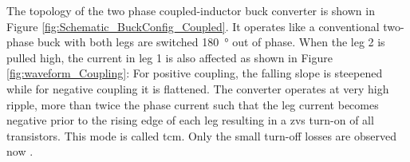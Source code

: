 \documentclass{IPEC2026}
\newcommand{\ac}{\gls}
\begin{document}
The topology of the two phase coupled-inductor buck converter is shown in Figure \ref{fig:Schematic_BuckConfig_Coupled}. It operates like a conventional two-phase buck with both legs are switched \qty{180}{\degree} out of phase. When the leg 2 is pulled high, the current in leg 1 is also affected as shown in Figure \ref{fig:waveform_Coupling}: For positive coupling, the falling slope is steepened while for negative coupling it is flattened. The converter operates at very high ripple, more than twice the phase current such that the leg current becomes negative prior to the rising edge of each leg resulting in a \ac{zvs} turn-on of all transistors. This mode is called \ac{tcm}. Only the small turn-off losses are observed now \cite{marxgutInterleavedTriangularCurrent2010}.  %
\end{document}
